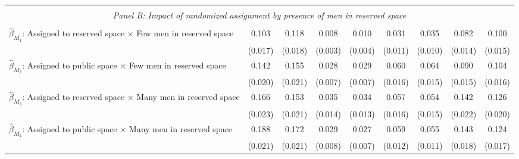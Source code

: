 \begin{tabular}{l*{8}{c}}
\hline \\[-1ex] \multicolumn{9}{c}{\textit{Panel B: Impact of randomized assignment by presence of men in reserved space}} \\\\[-1ex]
$\hat\beta_{M_1}$: Assigned to reserved space $\times$ Few men in reserved space&       0.103\sym{***}&       0.118\sym{***}&       0.008\sym{**} &       0.010\sym{***}&       0.031\sym{***}&       0.035\sym{***}&       0.082\sym{***}&       0.100\sym{***}\\
                    &     (0.017)         &     (0.018)         &     (0.003)         &     (0.004)         &     (0.011)         &     (0.010)         &     (0.014)         &     (0.015)         \\
[1em]
$\hat\beta_{M_2}$: Assigned to public space $\times$ Few men in reserved space&       0.142\sym{***}&       0.155\sym{***}&       0.028\sym{***}&       0.029\sym{***}&       0.060\sym{***}&       0.064\sym{***}&       0.090\sym{***}&       0.104\sym{***}\\
                    &     (0.020)         &     (0.021)         &     (0.007)         &     (0.007)         &     (0.016)         &     (0.015)         &     (0.015)         &     (0.016)         \\
[1em]
$\hat\beta_{M_3}$: Assigned to reserved space $\times$ Many men in reserved space&       0.166\sym{***}&       0.153\sym{***}&       0.035\sym{**} &       0.034\sym{**} &       0.057\sym{***}&       0.054\sym{***}&       0.142\sym{***}&       0.126\sym{***}\\
                    &     (0.023)         &     (0.021)         &     (0.014)         &     (0.013)         &     (0.016)         &     (0.015)         &     (0.022)         &     (0.020)         \\
[1em]
$\hat\beta_{M_4}$: Assigned to public space $\times$ Many men in reserved space&       0.188\sym{***}&       0.172\sym{***}&       0.029\sym{***}&       0.027\sym{***}&       0.059\sym{***}&       0.055\sym{***}&       0.143\sym{***}&       0.124\sym{***}\\
                    &     (0.021)         &     (0.021)         &     (0.008)         &     (0.007)         &     (0.012)         &     (0.011)         &     (0.018)         &     (0.017)         \\

\end{tabular}
